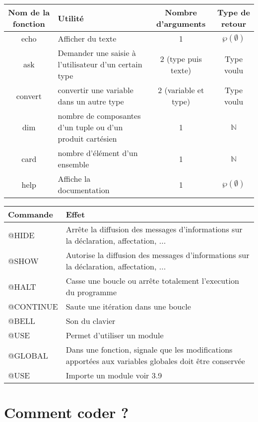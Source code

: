 \documentclass{article}
\begin{document}
\noindent\begin{tabular}{|c|p{5cm}|c|c|}
\hline
    Nom de la fonction & Utilité & Nombre d'arguments&Type de retour \\
    \hline
    echo & Afficher du texte & 1 & $\wp(\emptyset)$\\
    \hline
    ask & Demander une saisie à l'utilisateur d'un certain type & 2 (type puis texte) & Type voulu\\
    \hline
    convert & convertir une variable dans un autre type & 2 (variable et type) & Type voulu\\
    \hline
    dim & nombre de composantes d'un tuple ou d'un produit cartésien & 1 & $\mathbb N$\\
    \hline
    card & nombre d'élément d'un ensemble & 1 & $\mathbb N$\\
    \hline
    help & Affiche la documentation & 1 & $\wp(\emptyset)$\\
    \hline
\end{tabular}

\vspace{0,5cm}

\noindent\begin{tabular}{|p{}|p{}|}
    \hline
    Commande & Effet \\
    \hline
     @HIDE &  Arrête la diffusion des messages d'informations sur la déclaration, affectation, ...\\
     \hline
     @SHOW & Autorise la diffusion des messages d'informations sur la déclaration, affectation, ...\\ 
     \hline
     @HALT & Casse une boucle ou arrête totalement l'execution du programme\\
     \hline
     @CONTINUE & Saute une itération dans une boucle\\
     \hline
     @BELL & Son du clavier\\
     \hline
     @USE & Permet d'utiliser un module\\
     \hline
     @GLOBAL & Dans une fonction, signale que les modifications apportées aux variables globales doit être conservée\\
     \hline
     @USE & Importe un module voir 3.9\\
     \hline
\end{tabular}
\newpage

\section{Comment coder ?}
\end{document}

